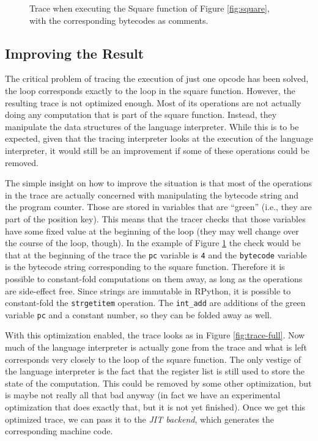 \documentclass{sig-alternate}
\newcommand\ie{i.e.,\xspace}
\begin{document}
\begin{figure}

\caption{Trace when executing the Square function of Figure \ref{fig:square},
with the corresponding bytecodes as comments.}
\label{fig:trace-no-green-folding}
\end{figure}

\subsection{Improving the Result}

The critical problem of tracing the execution of just one opcode has been
solved, the loop corresponds exactly to the loop in the square function.
However, the resulting trace is not optimized enough. Most of its operations are not
actually doing any computation that is part of the square function. Instead,
they manipulate the data structures of the language interpreter. While this is
to be expected, given that the tracing interpreter looks at the execution of the
language interpreter, it would still be an improvement if some of these operations could
be removed.

The simple insight on how to improve the situation is that most of the operations
in the trace are actually concerned with manipulating the bytecode string and
the program counter. Those are stored in variables that are ``green'' (\ie they
are part of the position key).  This means that the tracer checks that those
variables have some fixed value at the beginning of the loop (they may well
change over the course of the loop, though). In the example of Figure
\ref{fig:trace-no-green-folding} the check would be that at the beginning of the
trace the \texttt{pc} variable is \texttt{4} and the \texttt{bytecode} variable
is the bytecode string corresponding to the square function. Therefore it is
possible to constant-fold computations on them away,
as long as the operations are side-effect free. Since strings are immutable in
RPython, it is possible to constant-fold the \texttt{strgetitem} operation. The
\texttt{int\_add} are additions of the green variable \texttt{pc} and a constant
number, so they can be folded away as well.

With this optimization enabled, the trace looks as in Figure
\ref{fig:trace-full}. Now much of the language interpreter is actually gone
from the trace and what is left corresponds very closely to the loop of the
square function. The only vestige of the language interpreter is the fact that
the register list is still used to store the state of the computation. This
could be removed by some other optimization, but is maybe not really all that
bad anyway (in fact we have an experimental optimization that does exactly that,
but it is not yet finished).  Once we get this optimized trace, we can pass it to
the \emph{JIT backend}, which generates the corresponding machine code.
\end{document}
